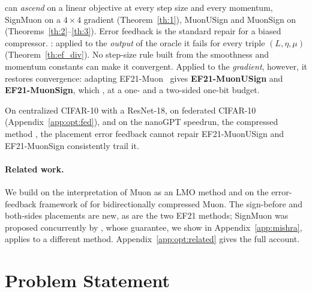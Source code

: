  can \emph{ascend} on a linear objective at every step size and every momentum, SignMuon on a $4\times4$ gradient (Theorem~\ref{th:1}), MuonUSign and MuonSign on  (Theorems~\ref{th:2}--\ref{th:3}). Error feedback is the standard repair for a biased compressor. : applied to the \emph{output} of the oracle it fails for every triple $(L,\eta,\mu)$ (Theorem~\ref{th:ef_div}). No step-size rule built from the smoothness and momentum constants can make it convergent. Applied to the \emph{gradient}, however, it restores convergence: adapting EF21-Muon~\citep{gruntkowska2025error} gives \textbf{EF21-MuonUSign} and \textbf{EF21-MuonSign}, which , at a one- and a two-sided one-bit budget.

 On centralized CIFAR-10 with a ResNet-18, on federated CIFAR-10 (Appendix~\ref{app:opt:fed}), and on the nanoGPT speedrun, the  compressed method , the placement error feedback cannot repair EF21-MuonUSign and EF21-MuonSign consistently trail it. 

\paragraph{Related work.} We build on the interpretation of Muon as an LMO method \citep{bernstein2024old,pethick2025training,riabinin2025gluon} and on the error-feedback framework of \citet{gruntkowska2025error} for bidirectionally compressed Muon. The sign-before and both-sides placements are new, as are the two EF21 methods; SignMuon was proposed concurrently by \citet{mishra2026signmuon}, whose guarantee, we show in Appendix~\ref{app:mishra}, applies to a different method. Appendix~\ref{app:opt:related} gives the full account.

\section{Problem Statement}\label{sec:proState}

